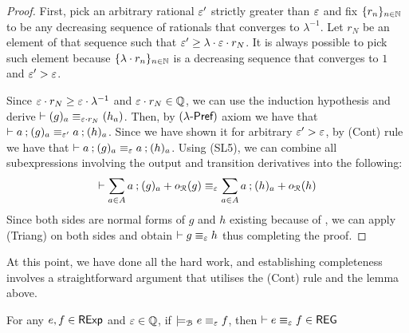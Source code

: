 \begin{proof}
First, pick an arbitrary rational $\varepsilon'$ strictly greater than $\varepsilon$ and fix $\{r_n\}_{n \in \mathbb{N}}$ to be any decreasing sequence of rationals that converges to $\lambda^{-1}$. Let $r_N$ be an element of that sequence such that $\varepsilon' \geq \lambda \cdot \varepsilon \cdot r_N$. It is always possible to pick such element because $\{\lambda \cdot r_n\}_{n \in \mathbb{N}}$ is a decreasing sequence that converges to $1$ and $\varepsilon' > \varepsilon$. 

Since $\varepsilon \cdot r_N \geq \varepsilon \cdot \lambda^{-1}$ and $\varepsilon \cdot r_{N} \in \mathbb{Q}$, we can use the induction hypothesis and derive $\vdash (g)_a \equiv_{\varepsilon \cdot r_{N}} (h_a)$. Then, by $(\textsf{$\lambda$-Pref})$ axiom we have that $\vdash a \mathbin{;} (g)_a \equiv_{\varepsilon'} a \mathbin{;} (h)_a$. Since we have shown it for arbitrary $\varepsilon' > \varepsilon$, by \textsf{(Cont)} rule we have that $\vdash a\mathbin{;} (g)_a \equiv_{\varepsilon} a \mathbin{;} (h)_a $. Using \textsf{(SL5)}, we can combine all subexpressions involving the output and transition derivatives into the following:
	$$
	\vdash \sum_{a \in {A}} a \mathbin{;} (g)_a + o_{\mathcal{R}}(g) \equiv_{\varepsilon} \sum_{a \in {A}} a \mathbin{;} (h)_a + o_{\mathcal{R}}(h)
	$$
	Since both sides are normal forms of $g$ and $h$ existing because of , we can apply \textsf{(Triang)} on both sides and obtain $\vdash g \equiv_{\varepsilon} h$ thus completing the proof.
\end{proof}
At this point, we have done all the hard work, and establishing completeness involves a straightforward argument that utilises the \textsf{(Cont)} rule and the lemma above.
\begin{theorem}[Completeness]\label{c2:completeness}
       For any $e, f \in \mathsf{RExp}$ and $\varepsilon \in \mathbb{Q}$, if $\models_{\mathcal{B}} e \equiv_\varepsilon f$, then $\vdash e \equiv_\varepsilon f \in \mathsf{REG}$
\end{theorem}
